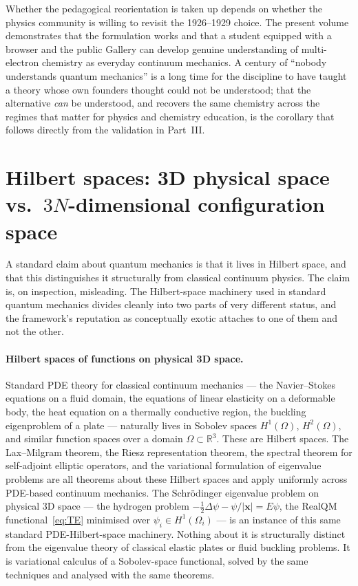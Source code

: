 Whether the pedagogical reorientation is taken up depends on whether the physics community is willing to revisit the 1926--1929 choice. The present volume demonstrates that the formulation works and that a student equipped with a browser and the public Gallery can develop genuine understanding of multi-electron chemistry as everyday continuum mechanics. A century of ``nobody understands quantum mechanics'' is a long time for the discipline to have taught a theory whose own founders thought could not be understood; that the alternative \emph{can} be understood, and recovers the same chemistry across the regimes that matter for physics and chemistry education, is the corollary that follows directly from the validation in Part~III.

\section{Hilbert spaces: 3D physical space vs.\ \texorpdfstring{$3N$}{3N}-dimensional configuration space}\label{sec:hilbert-distinction}

A standard claim about quantum mechanics is that it lives in Hilbert space, and that this distinguishes it structurally from classical continuum physics. The claim is, on inspection, misleading. The Hilbert-space machinery used in standard quantum mechanics divides cleanly into two parts of very different status, and the framework's reputation as conceptually exotic attaches to one of them and not the other.

\paragraph{Hilbert spaces of functions on physical 3D space.}
Standard PDE theory for classical continuum mechanics --- the Navier--Stokes equations on a fluid domain, the equations of linear elasticity on a deformable body, the heat equation on a thermally conductive region, the buckling eigenproblem of a plate --- naturally lives in Sobolev spaces $H^1(\Omega)$, $H^2(\Omega)$, and similar function spaces over a domain $\Omega \subset \mathbb{R}^3$. These are Hilbert spaces. The Lax--Milgram theorem, the Riesz representation theorem, the spectral theorem for self-adjoint elliptic operators, and the variational formulation of eigenvalue problems are all theorems about these Hilbert spaces and apply uniformly across PDE-based continuum mechanics. The Schr\"odinger eigenvalue problem on physical 3D space --- the hydrogen problem $-\tfrac{1}{2}\Delta\psi - \psi/|\mathbf{x}| = E\psi$, the RealQM functional~\eqref{eq:TE} minimised over $\psi_i \in H^1(\Omega_i)$ --- is an instance of this same standard PDE-Hilbert-space machinery. Nothing about it is structurally distinct from the eigenvalue theory of classical elastic plates or fluid buckling problems. It is variational calculus of a Sobolev-space functional, solved by the same techniques and analysed with the same theorems.


